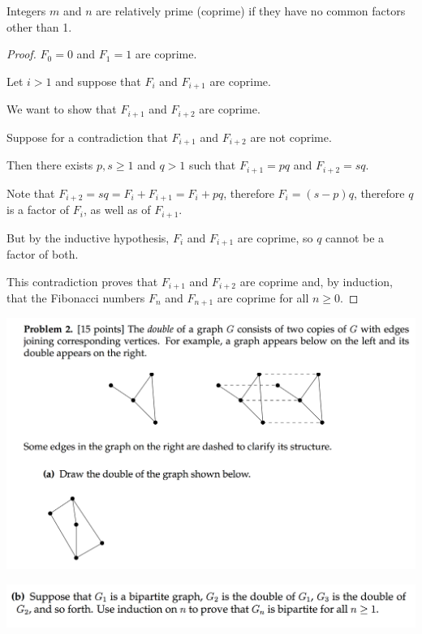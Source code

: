 \documentclass[12pt]{article}
\begin{document}
\begin{definition*}
  Integers $m$ and $n$ are relatively prime (coprime) if they have no common factors other than 1.
\end{definition*}


\begin{proof}
  $F_0 = 0$ and $F_1 = 1$ are coprime.

  Let $i > 1$ and suppose that $F_{i}$ and $F_{i+1}$ are coprime.

  We want to show that $F_{i+1}$ and $F_{i+2}$ are coprime.

  Suppose for a contradiction that $F_{i+1}$ and $F_{i+2}$ are not coprime.

  Then there exists $p, s \geq 1$ and $q > 1$ such that $F_{i+1} = pq$ and $F_{i+2} = sq$.

  Note that $F_{i+2} = sq = F_{i} + F_{i+1} = F_i + pq$, therefore $F_i = (s - p)q$, therefore
  $q$ is a factor of $F_i$, as well as of $F_{i+1}$.

  But by the inductive hypothesis, $F_{i}$ and $F_{i+1}$ are coprime, so $q$ cannot be a factor of
  both.

  This contradiction proves that $F_{i+1}$ and $F_{i+2}$ are coprime and, by induction, that the
  Fibonacci numbers $F_n$ and $F_{n+1}$ are coprime for all $n \geq 0$.


\end{proof}

\begin{mdframed}
\includegraphics[width=400pt]{img/MIT-math-for-cs-2004-2-1.png}
\end{mdframed}

\begin{mdframed}
\includegraphics[width=400pt]{img/MIT-math-for-cs-2004-2-2.png}
\end{mdframed}
\end{document}
